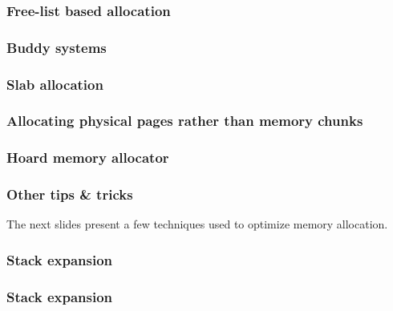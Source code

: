 
\begin{frame}
  \frametitle{Free-list based allocation}

\end{frame}


\begin{frame}
  \frametitle{Buddy systems}

\end{frame}


\begin{frame}
  \frametitle{Slab allocation}

\end{frame}


\begin{frame}
  \frametitle{Allocating physical pages rather than memory chunks}

\end{frame}


\begin{frame}
  \frametitle{Hoard memory allocator}

\end{frame}


\begin{frame}
  \frametitle{Other tips \& tricks}

  The next slides present a few techniques used to optimize memory
  allocation.

\end{frame}


\begin{frame}
  \frametitle{Stack expansion}

  \begin{center}
  \end{center}

\end{frame}


\begin{frame}
  \frametitle{Stack expansion}

  \begin{center}
  \end{center}

\end{frame}

